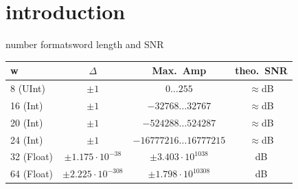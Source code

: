


\subtitle{Part 13: Digital Number Formats}


	

\section[intro]{introduction}

	\begin{frame}{number formats}{word length and SNR}
			\begin{table}
			\centering
				\begin{footnotesize}
					\begin{tabular}{lccc}
					\hline
						\textbf{w} & \textbf{$\Delta$} & \textbf{Max.\ Amp} & \textbf{theo.\ SNR} \\
					\hline
						8 (UInt)	&	$\pm1$ & $0\ldots255$ & $\approx$\unit[48]{dB}\\
						16 (Int)	&	$\pm1$ & $-32768\ldots32767$ & $\approx$\unit[96]{dB}\\
						20 (Int)	&	$\pm1$ & $-524288\ldots524287$ & $\approx$\unit[120]{dB}\\
						24 (Int)	&	$\pm1$ & $-16777216\ldots16777215$ & $\approx$\unit[144]{dB}\\
					\hline
						32 (Float)	&	$\pm1.175\cdot10^{-38}$ & $\pm3.403\cdot10^{1038}$ & \unit[1529]{dB}\\
						64 (Float)	&	$\pm2.225\cdot10^{-308}$ & $\pm1.798\cdot10^{10308}$ & \unit[12318]{dB}\\
					\hline
					\end{tabular}  
				\end{footnotesize}
			\end{table}
            
            \bigskip
            \bigskip
	\end{frame}	

